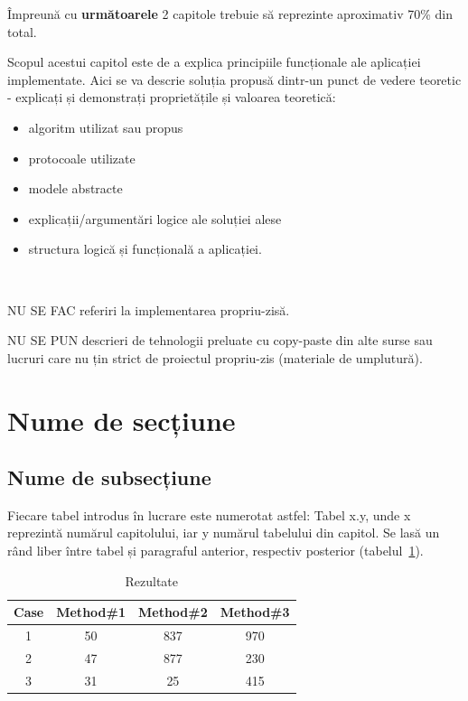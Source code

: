 {\color{blue}Împreună cu \textbf{următoarele} 2 capitole trebuie să reprezinte aproximativ 70\% din total.\\}

Scopul acestui capitol este de a explica principiile funcționale ale aplicației implementate.
Aici se va descrie soluția propusă dintr-un punct de vedere teoretic - explicați și demonstrați proprietățile și valoarea teoretică:
\begin{itemize}
	\item algoritm utilizat sau propus
	\item protocoale utilizate
	\item modele abstracte
	\item explicații/argumentări logice ale soluției alese
	\item structura logică și funcțională a aplicației.
\end{itemize}


~\\\parbox[c]{\textwidth}{\color{red}\bfseries

NU SE FAC referiri la implementarea propriu-zisă.

NU SE PUN descrieri de tehnologii preluate cu copy-paste din alte surse sau lucruri care nu țin strict de proiectul propriu-zis (materiale de umplutură).
}

\section{Nume de secțiune}\label{sec:context}

\subsection{Nume de subsecțiune}\label{subsec:numesub}

Fiecare tabel introdus în lucrare este numerotat astfel: Tabel x.y, unde x reprezintă numărul capitolului, iar y numărul tabelului din capitol.
Se lasă un rând liber între tabel și paragraful anterior, respectiv posterior (tabelul~\ref{tab:nonlin}).

\begin{table}[ht]
    \caption{Rezultate}
    \centering                          %
    \begin{tabular}{|c|c|c|c|}          %
        \hline
        Case & Method\#1 & Method\#2 & Method\#3 \\ [0.5ex]   %
        \hline                              %
        1 & 50 & 837 & 970 \\               %
        2 & 47 & 877 & 230 \\
        3 & 31 & 25 & 415 \\[1ex]           %
        \hline
    \end{tabular}
    \label{tab:nonlin}                %
\end{table}


